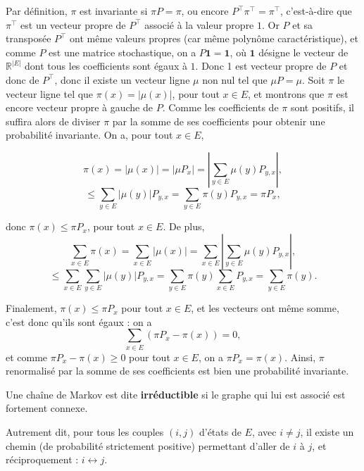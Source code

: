 \documentclass{article}
\begin{document}
\begin{tcolorbox}[colback=white,colframe=green!80!black,title=Démonstration, breakable]
Par définition, $\pi$ est invariante si $\pi P = \pi$, ou encore $P^{\top} \pi^{\top} = \pi^{\top}$, c'est-à-dire que $\pi^{\top}$ est un vecteur propre de $P^{\top}$ associé à la valeur propre $1$.
Or $P$ et sa transposée $P^{\top}$ ont même valeurs propres (car même polynôme caractéristique), et comme $P$ est une matrice stochastique, on a $P \mathbf{1} = \mathbf{1}$, où $\mathbf{1}$ désigne le vecteur de $\mathbb{R}^{|E|}$ dont tous les coefficients sont égaux à $1$.
Donc 1 est vecteur propre de $P$ et donc de $P^{\top}$, donc il existe un vecteur ligne $\mu$ non nul tel que $\mu P = \mu$. Soit $\pi$ le vecteur ligne tel que $\pi(x) = |\mu(x)|$, pour tout $x \in E$, et montrons que $\pi$ est encore vecteur propre à gauche de $P$.
Comme les coefficients de $\pi$ sont positifs, il suffira alors de diviser $\pi$ par la somme de ses coefficients pour obtenir une probabilité invariante. On a, pour tout $x \in E$,

\[
\pi(x) = |\mu(x)| = |\mu P_x| = \left| \sum_{y \in E} \mu(y) P_{y,x} \right|,
\]
\[
\leq \sum_{y \in E} |\mu(y)| P_{y,x} = \sum_{y \in E} \pi(y) P_{y,x} = \pi P_x,
\]

donc $\pi(x) \leq \pi P_x$, pour tout $x \in E$. De plus,
\[
\sum_{x \in E} \pi(x) = \sum_{x \in E} |\mu(x)| = \sum_{x \in E} \left| \sum_{y \in E} \mu(y) P_{y,x} \right|,
\]
\[
\leq \sum_{x \in E} \sum_{y \in E} |\mu(y)| P_{y,x} = \sum_{y \in E} \pi(y) \sum_{x \in E} P_{y,x} = \sum_{y \in E} \pi(y).
\]

Finalement, $\pi(x) \leq \pi P_x$ pour tout $x \in E$, et les vecteurs ont même somme, c’est donc qu’ils sont égaux : on a
\[
\sum_{x \in E} (\pi P_x - \pi(x)) = 0,
\]
et comme $\pi P_x - \pi(x) \geq 0$ pour tout $x \in E$, on a $\pi P_x = \pi(x)$. Ainsi, $\pi$ renormalisé par la somme de ses coefficients est bien une probabilité invariante.
\end{tcolorbox}
  

\begin{tcolorbox}[colback=white,colframe=blue!80!black,title=Chaîne de Markov irréductible]
Une chaîne de Markov est dite \textbf{irréductible} si le graphe qui lui est associé est fortement connexe.

Autrement dit, pour tous les couples $(i, j)$ d'états de $E$, avec $i \neq j$, il existe un chemin (de probabilité strictement positive) permettant d'aller de $i$ à $j$, et réciproquement : $i \leftrightarrow j$.
\end{tcolorbox}
\end{document}
